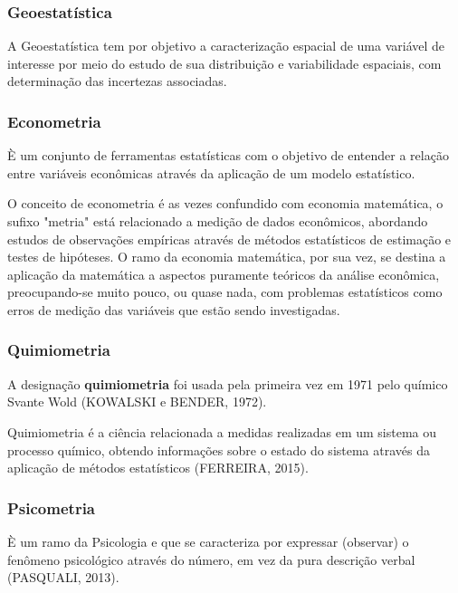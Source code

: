 \subsubsection{Geoestatística} 

A Geoestatística tem por objetivo a
caracterização espacial de uma variável de interesse por meio do
estudo de sua distribuição e variabilidade espaciais, com
determinação das incertezas associadas.\vskip0.3cm


\subsubsection{Econometria} 

È um conjunto de ferramentas estatísticas com o objetivo de entender a relação entre variáveis econômicas através da aplicação de um modelo estatístico.\vskip0.3cm

O conceito de econometria é as vezes confundido com economia matemática, o sufixo "metria"
está relacionado a medição de dados econômicos, abordando estudos de observações empíricas
através de métodos estatísticos de estimação e testes de hipóteses. O ramo da economia
matemática, por sua vez, se destina a aplicação da matemática a aspectos puramente teóricos
da análise econômica, preocupando-se muito pouco, ou quase nada, com problemas estatísticos
como erros de medição das variáveis que estão sendo investigadas.\vskip0.3cm


\subsubsection{Quimiometria} 

A designação \textbf{quimiometria} foi usada pela primeira vez em 1971 pelo químico Svante Wold (KOWALSKI e BENDER, 1972).
\vskip0.3cm

Quimiometria é a ciência relacionada a
medidas realizadas em um sistema ou processo químico, obtendo
informações sobre o estado do sistema através da aplicação de
métodos estatísticos (FERREIRA, 2015).\vskip0.3cm

\subsubsection{Psicometria} 

È um ramo da Psicologia e que se caracteriza por expressar (observar) o fenômeno psicológico através do número, em vez da pura descrição verbal (PASQUALI, 2013).  
\vskip0.3cm

